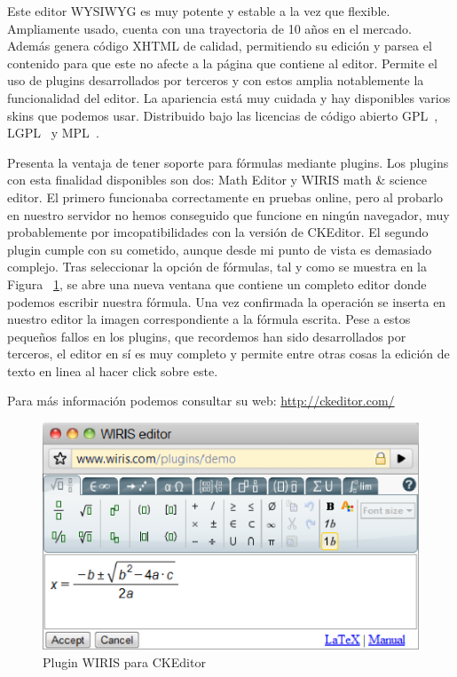Este editor WYSIWYG es muy potente y estable a la vez que flexible. Ampliamente usado, cuenta con una trayectoria de 10 años en el mercado. Además genera código XHTML de calidad, permitiendo su edición y parsea el contenido para que este no afecte a la página que contiene al editor. Permite el uso de plugins desarrollados por terceros y con estos amplia notablemente la funcionalidad del editor. La apariencia está muy cuidada y hay disponibles varios skins que podemos usar. Distribuido bajo las licencias de código abierto GPL~\cite{GPL:gpl}, LGPL~\cite{LGPL:lgpl} y MPL~\cite{MPL:mpl}.

Presenta la ventaja de tener soporte para fórmulas mediante plugins. Los plugins con esta finalidad disponibles son dos: Math Editor y WIRIS math \& science editor. El primero funcionaba correctamente en pruebas online, pero al probarlo en nuestro servidor no hemos conseguido que funcione en ningún navegador, muy probablemente por imcopatibilidades con la versión de CKEditor. El segundo plugin cumple con su cometido, aunque desde mi punto de vista es demasiado complejo. Tras seleccionar la opción de fórmulas, tal y como se muestra en la Figura ~\ref{fig:ckmath}, se abre una nueva ventana que contiene un completo editor donde podemos escribir nuestra fórmula. Una vez confirmada la operación se inserta en nuestro editor la imagen correspondiente a la fórmula escrita. Pese a estos pequeños fallos en los plugins, que recordemos han sido desarrollados por terceros, el editor en sí es muy completo y permite entre otras cosas la edición de texto en linea al hacer click sobre este. 

Para más información podemos consultar su web: \url{http://ckeditor.com/}

\begin{figure}[h!]
  \centering
      \includegraphics[width=1.0\textwidth]{fig/cke3}
  \caption{Plugin WIRIS para CKEditor}
  \label{fig:ckmath}
\end{figure}

